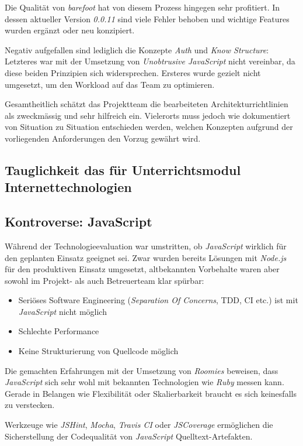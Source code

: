 Die Qualität von \emph{barefoot} hat von diesem Prozess hingegen sehr profitiert. In dessen aktueller Version \emph{0.0.11} sind viele Fehler behoben und wichtige Features wurden ergänzt oder neu konzipiert.

Negativ aufgefallen sind lediglich die Konzepte \emph{Auth} und \emph{Know Structure}: Letzteres war mit der Umsetzung von \emph{Unobtrusive JavaScript} nicht vereinbar, da diese beiden Prinzipien sich widersprechen. Ersteres wurde gezielt nicht umgesetzt, um den Workload auf das Team zu optimieren.

Gesamtheitlich schätzt das Projektteam die bearbeiteten Architekturrichtlinien als zweckmässig und sehr hilfreich ein. Vielerorts muss jedoch wie dokumentiert von Situation zu Situation entschieden werden, welchen Konzepten aufgrund der vorliegenden Anforderungen den Vorzug gewährt wird.


\subsection*{Tauglichkeit das für Unterrichtsmodul Internettechnologien}



\subsection*{Kontroverse: JavaScript}
Während der Technologieevaluation war umstritten, ob \emph{JavaScript} wirklich für den geplanten Einsatz geeignet sei. Zwar wurden bereits Lösungen mit \emph{Node.js} für den produktiven Einsatz umgesetzt, altbekannten Vorbehalte waren aber sowohl im Projekt- als auch Betreuerteam klar spürbar:

\begin{itemize}
	\item Seriöses Software Engineering (\emph{Separation Of Concerns}, \gls{TDD}, CI etc.) ist mit \emph{JavaScript} nicht möglich
	\item Schlechte Performance
	\item Keine Strukturierung von Quellcode möglich
\end{itemize}

Die gemachten Erfahrungen mit der Umsetzung von \emph{Roomies} beweisen, dass \emph{JavaScript} sich sehr wohl mit bekannten Technologien wie \emph{Ruby} messen kann. Gerade in Belangen wie Flexibilität oder Skalierbarkeit braucht es sich keinesfalls zu verstecken.

Werkzeuge wie \emph{JSHint}, \emph{Mocha}, \emph{Travis CI} oder \emph{JSCoverage} ermöglichen die Sicherstellung der Codequalität von \emph{JavaScript} Quelltext-Artefakten.

